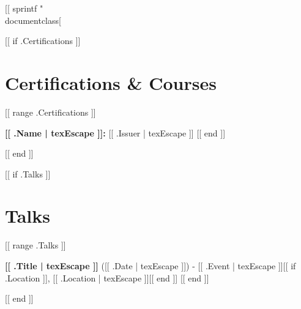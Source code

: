 [[ sprintf "\\documentclass[%
\begin{document}
[[ if .Certifications ]]
\section{Certifications \& Courses}
 \begin{itemize}[leftmargin=0.15in, label={}]
    \small{
     [[ range .Certifications ]]
     \item \textbf{[[ .Name | texEscape ]]:} [[ .Issuer | texEscape ]]
     [[ end ]]
    }
 \end{itemize}
[[ end ]]

[[ if .Talks ]]
\section{Talks}
 \begin{itemize}[leftmargin=0.15in, label={}]
    \small{
     [[ range .Talks ]]
     \item \textbf{[[ .Title | texEscape ]]} ([[ .Date | texEscape ]]) - [[ .Event | texEscape ]][[ if .Location ]], [[ .Location | texEscape ]][[ end ]]
     [[ end ]]
    }
 \end{itemize}
[[ end ]]
\end{document}
